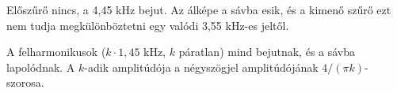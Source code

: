Előszűrő nincs, a 4,45 kHz bejut. Az álképe a sávba esik, és a kimenő szűrő ezt nem tudja megkülönböztetni egy valódi 3,55 kHz-es jeltől.

\begin{center}\end{center}

A felharmonikusok ($k\cdot1{,}45$ kHz, $k$ páratlan) mind bejutnak, és a sávba lapolódnak. A $k$-adik amplitúdója a négyszögjel amplitúdójának $4/(\pi k)$-szorosa.

\begin{center}\end{center}
\begin{eredmeny}

\begin{center}\end{center}
\end{eredmeny}


